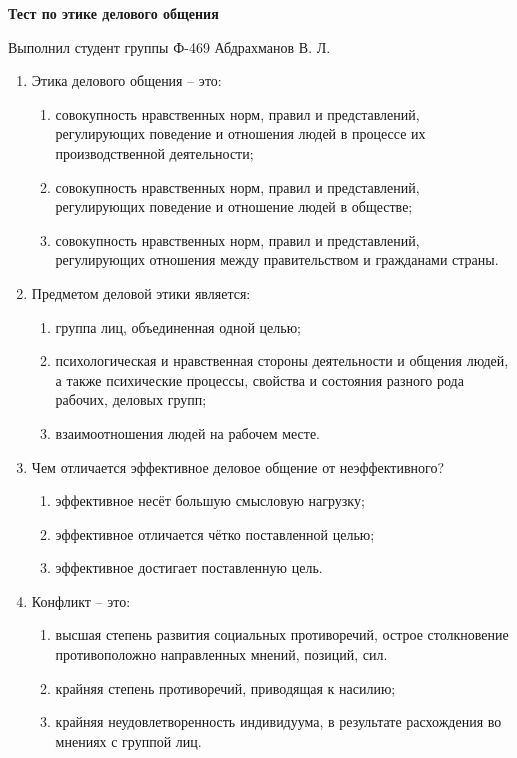 \documentclass[12pt,pscyr]{hedwork}
\renewcommand{\labelenumii}{\asbuk{enumii})}
\newcommand{\itempo}{\stepcounter{enumii}\item[\bfseries\labelenumii]}
\begin{document}
  
  \begin{center}
    \bfseries Тест по этике делового общения
  \end{center}
  \vspace{-2em}
  \begin{flushright}
    Выполнил студент группы Ф-469 Абдрахманов В. Л.
  \end{flushright}
  
  \begin{enumerate}
    \item Этика делового общения -- это:
      \begin{enumerate}
        \itempo совокупность нравственных норм, правил и представлений,
          регулирующих поведение и отношения людей в процессе их
          производственной деятельности;
        \item совокупность нравственных норм, правил и представлений,
          регулирующих поведение и отношение людей в обществе;
        \item совокупность нравственных норм, правил и представлений,
          регулирующих отношения между правительством и гражданами страны.
      \end{enumerate}

    \item Предметом деловой этики является:
      \begin{enumerate}
        \item группа лиц, объединенная одной целью;
        \itempo психологическая и нравственная стороны деятельности и общения
          людей, а также психические процессы, свойства и состояния разного
          рода рабочих, деловых групп;
        \item взаимоотношения людей на рабочем месте.
      \end{enumerate}

    \item Чем отличается эффективное деловое общение от неэффективного? 
      \begin{enumerate}
        \item эффективное несёт большую смысловую нагрузку;
        \item эффективное отличается чётко поставленной целью; 
        \item эффективное достигает поставленную цель.
      \end{enumerate}

    \item Конфликт -- это:
      \begin{enumerate}
        \itempo высшая степень развития социальных противоречий, острое
          столкновение противоположно направленных мнений, позиций, сил.
        \item крайняя степень противоречий, приводящая к насилию;
        \item крайняя неудовлетворенность индивидуума, в результате расхождения
          во мнениях с группой лиц.
      \end{enumerate}


\end{enumerate}
\end{document}
